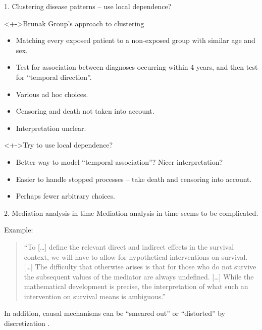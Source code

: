 \documentclass{beamer}\usepackage{listings}
\begin{document}
\begin{frame}[label={sec:orge7afa2a}]{1. Clustering disease patterns -- use local dependence?}
\begin{block}<+->{Brunak Group's approach to clustering}
\begin{itemize}
\item Matching every exposed patient to a non-exposed group with similar age and sex.
\item Test for association between diagnoses occurring within 4 years, and then test for ``temporal
direction''.
\item Various ad hoc choices.
\item Censoring and death not taken into account.
\item Interpretation unclear.
\end{itemize}
\end{block}

\begin{block}<+->{Try to use local dependence?}
\begin{itemize}
\item Better way to model ``temporal association''? Nicer interpretation?
\item Easier to handle stopped processes -- take death and censoring into account.
\item Perhaps fewer arbitrary choices.
\end{itemize}
\end{block}
\end{frame}

\begin{frame}[label={sec:org1cabb09}]{2. Mediation analysis in time}
Mediation analysis in time seems to be complicated. \pause

\begin{block}{Example:}
\begin{quote} %
``To [\ldots{}] define the relevant direct and indirect effects in the survival context, we will have to
allow for hypothetical interventions on survival. [\ldots{}] The difficulty that otherwise arises is that
for those who do not survive the subsequent values of the mediator are always undefined. [\ldots{}] While
the mathematical development is precise, the interpretation of what such an intervention on survival
means is ambiguous.'' \citep[p.4154]{lin2017mediation}

\pause
\end{quote}
\end{block}
In addition, causal mechanisms can be ``smeared out'' or ``distorted'' by discretization
\citep{aalen2016can}.
\end{frame}
\end{document}
